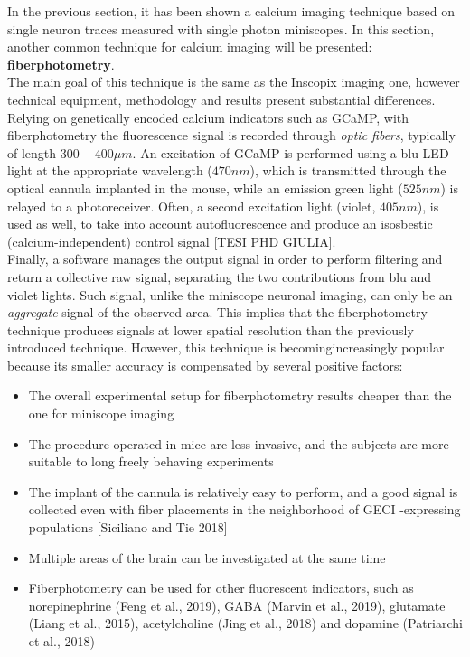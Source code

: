 \documentclass[a4paper]{article}
\begin{document}
In the previous section, it has been shown a calcium imaging technique based on single neuron traces measured with single photon miniscopes. In this section, another common technique for calcium imaging will be presented: \textbf{fiberphotometry}. \\
The main goal of this technique is the same as the Inscopix imaging one, however technical equipment, methodology and results present substantial differences.\\
Relying on genetically encoded calcium indicators such as GCaMP, with fiberphotometry the fluorescence signal is recorded through \textit{optic fibers}, typically of length $300-400 \mu m$. An excitation of GCaMP is performed using a blu LED light at the appropriate wavelength ($470 nm$), which is transmitted through the optical cannula implanted in the mouse, while an emission green light ($525 nm$) is relayed to a photoreceiver. Often, a second excitation light (violet, $405 nm$), is used as well, to take into account autofluorescence and produce an isosbestic (calcium-independent) control signal [TESI PHD GIULIA].\\
 Finally, a software manages the output signal in order to perform filtering and return a collective raw signal, separating the two contributions from blu and violet lights. Such signal, unlike the miniscope neuronal imaging, can only be an \textit{aggregate} signal of the observed area. This implies that the fiberphotometry technique produces signals at lower spatial resolution than the previously introduced technique. However, this technique is becomingincreasingly popular because its smaller accuracy is compensated by several positive factors:

\begin{itemize}
	
	\item The overall experimental setup for fiberphotometry results cheaper than the one for miniscope imaging 
	
	\item The procedure operated in mice are less invasive, and the subjects are more suitable to long freely behaving experiments
	
	\item The implant of the cannula is relatively easy to perform, and a good signal is collected even with fiber placements in the neighborhood of GECI -expressing populations [Siciliano and Tie 2018]
	
	\item Multiple areas of the brain can be investigated at the same time 
	
	\item Fiberphotometry can be used for other fluorescent indicators, such as norepinephrine (Feng et al., 2019), GABA (Marvin et al., 2019), glutamate (Liang et al., 2015),
	acetylcholine (Jing et al., 2018) and dopamine (Patriarchi et al., 2018)
	
	
	
\end{itemize}
\end{document}
